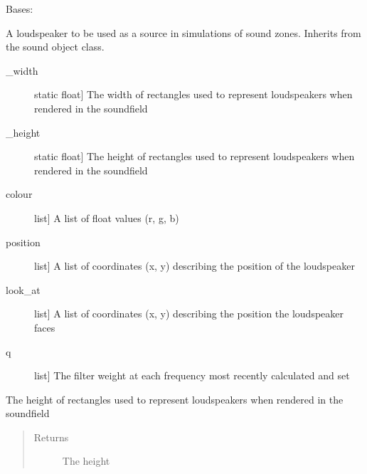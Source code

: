\documentclass[letterpaper,10pt,english]{sphinxmanual}
\begin{document}

\begin{fulllineitems}
\label{\detokenize{source/pyzones:pyzones.Loudspeaker}}
Bases: {\hyperref[\detokenize{source/pyzones:pyzones.SoundObject}]{}}

A loudspeaker to be used as a source in simulations of sound zones. Inherits from the sound object class.
\begin{description}
\item[{\_width}] \leavevmode{[}static float{]}
The width of rectangles used to represent loudspeakers when rendered in the soundfield

\item[{\_height}] \leavevmode{[}static float{]}
The height of rectangles used to represent loudspeakers when rendered in the soundfield

\end{description}
\begin{description}
\item[{colour}] \leavevmode{[}list{]}
A list of float values (r, g, b)

\item[{position}] \leavevmode{[}list{]}
A list of coordinates (x, y) describing the position of the loudspeaker

\item[{look\_at}] \leavevmode{[}list{]}
A list of coordinates (x, y) describing the position the loudspeaker faces

\item[{q}] \leavevmode{[}list{]}
The filter weight at each frequency most recently calculated and set

\end{description}

\begin{fulllineitems}
\label{\detokenize{source/pyzones:pyzones.Loudspeaker.height}}
The height of rectangles used to represent loudspeakers when rendered in the soundfield
\begin{quote}\begin{description}
\item[{Returns}] \leavevmode
The height


\end{description}
\end{quote}
\end{fulllineitems}
\end{fulllineitems}
\end{document}
